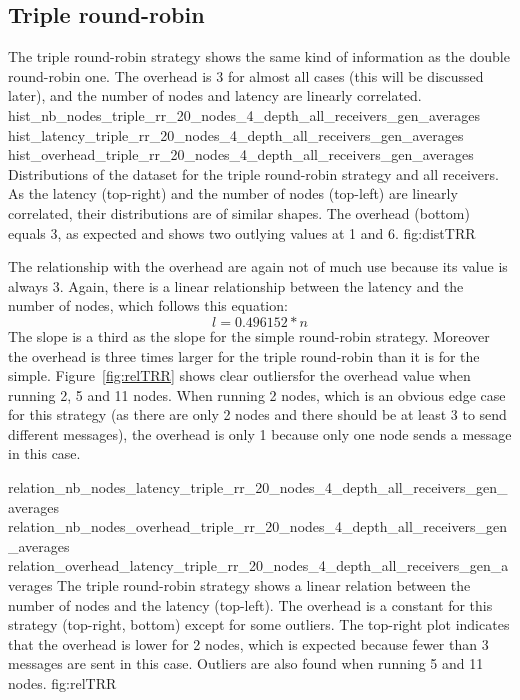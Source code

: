 \subsection{Triple round-robin}
The triple round-robin strategy shows  the same kind of information as the
double round-robin one. The overhead is 3 for almost all cases (this will be
discussed later), and the number of nodes and latency are linearly correlated.
\triplefigure
    {hist_nb_nodes_triple_rr_20_nodes_4_depth_all_receivers_gen_averages}
    {hist_latency_triple_rr_20_nodes_4_depth_all_receivers_gen_averages}
    {hist_overhead_triple_rr_20_nodes_4_depth_all_receivers_gen_averages}
    {Distributions of the dataset for the triple round-robin strategy and all
    receivers. As the latency (top-right) and the number of nodes (top-left) are
    linearly correlated, their distributions are of similar shapes. The
    overhead (bottom) equals 3, as expected and shows two outlying values at 1
    and 6.}
    {fig:distTRR}

The relationship with the overhead are again not of much use because its value
is always 3. Again, there is a linear relationship between the latency and the
number of nodes, which follows this equation:
    \[l = 0.496152 * n\]
The slope is a third as the slope for the simple round-robin strategy. Moreover
the overhead is three times larger for the triple round-robin than it is for the
simple.
Figure~\ref{fig:relTRR} shows clear outliersfor the overhead value when running
2, 5 and 11 nodes. When running 2 nodes, which is an obvious edge case for this
strategy (as there are only 2 nodes and there should be at least 3 to send
different messages), the overhead is only 1 because only one node sends a
message in this case. 

\triplefigure
    {relation_nb_nodes_latency_triple_rr_20_nodes_4_depth_all_receivers_gen_averages}
    {relation_nb_nodes_overhead_triple_rr_20_nodes_4_depth_all_receivers_gen_averages}
    {relation_overhead_latency_triple_rr_20_nodes_4_depth_all_receivers_gen_averages}
    {The triple round-robin strategy shows a linear relation between the number of
    nodes and the latency (top-left). The overhead is a constant for this
    strategy (top-right, bottom) except for some outliers. The top-right plot
    indicates that the overhead is lower for 2 nodes, which is expected because
    fewer than 3 messages are sent in this case. Outliers are also found when
    running 5 and 11 nodes.}
    {fig:relTRR}

